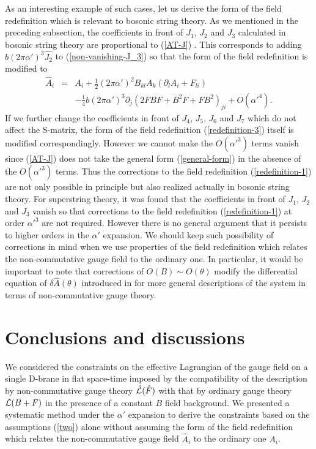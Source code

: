 \documentclass[a4paper,12pt]{article}
\begin{document}
As an interesting example of such cases,
let us derive the form of the field redefinition
which is relevant to bosonic string theory.
As we mentioned in the preceding subsection,
the coefficients in front of $J_1$, $J_2$ and $J_3$
calculated in bosonic string theory are
proportional to (\ref{AT-J}) \cite{AT1,AT2}.
This corresponds to adding $b (2 \pi \alpha')^3 \hat{J_2}$
to (\ref{non-vanishing-J_3}) so that the form of
the field redefinition is modified to
\begin{eqnarray}
\hat{A}_i &=& A_i + \frac{1}{2} (2 \pi \alpha')^2
B_{kl} A_k (\partial_l A_i + F_{li})
\nonumber \\
&& -\frac{1}{4} b (2 \pi \alpha')^3
\partial_j ( 2 F B F + B^2 F + F B^2 )_{ji}
+ O(\alpha'^4).
\label{redefinition-3}
\end{eqnarray}
If we further change the coefficients in front of $J_4$, $J_5$,
$J_6$ and $J_7$ which do not affect the S-matrix,
the form of the field redefinition (\ref{redefinition-3})
itself is modified correspondingly.
However we cannot make the $O(\alpha'^3)$ terms vanish
since (\ref{AT-J}) does not take the general form
(\ref{general-form}) in the absence of the $O(\alpha'^3)$ terms.
Thus the corrections to the field redefinition
(\ref{redefinition-1}) are not only possible in principle
but also realized actually in bosonic string theory.
For superstring theory, it was found that the coefficients
in front of $J_1$, $J_2$ and $J_3$ vanish \cite{AT1}
so that corrections to the field redefinition
(\ref{redefinition-1}) at order $\alpha'^3$
are not required.
However there is no general argument that it persists
to higher orders in the $\alpha'$ expansion.
We should keep such possibility of corrections in mind
when we use properties
of the field redefinition which relates the non-commutative
gauge field to the ordinary one.
In particular, it would be important to note that
corrections of $O(B) \sim O(\theta)$
modify the differential equation of $\delta \hat{A} (\theta)$
introduced in \cite{SW} for more general descriptions
of the system in terms of non-commutative gauge theory.

\section{Conclusions and discussions}
\setcounter{equation}{0}
\indent

We considered the constraints on the effective Lagrangian
of the gauge field on a single D-brane in flat space-time
imposed by the compatibility of the description
by non-commutative gauge theory $\hat{{\cal L}} (\hat{F})$
with that by ordinary gauge theory ${\cal L} (B+F)$
in the presence of a constant $B$ field background.
We presented a systematic method
under the $\alpha'$ expansion to derive
the constraints based on the assumptions (\ref{two}) alone
without assuming the form of the field redefinition
which relates the non-commutative gauge field $\hat{A}_i$
to the ordinary one $A_i$.
\end{document}
